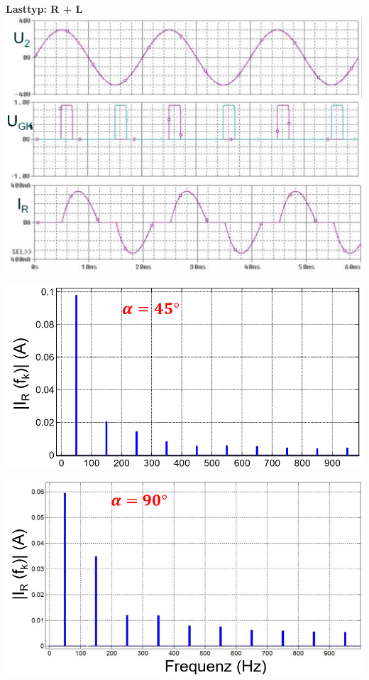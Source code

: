 \begin{minipage}{0.3\linewidth}
    \textbf{Lasttyp: R + L}\newline
    \includegraphics[width=\linewidth]{images/KLWSSteller2}
\end{minipage}

\begin{minipage}{0.3\linewidth}
    \includegraphics[width=\linewidth]{images/OW45WSSteller}
    
    \includegraphics[width=\linewidth]{images/OW90WSSteller}
\end{minipage}
\clearpage
